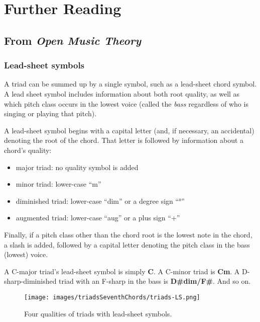 \documentclass{book}
\providecommand{\tightlist}{%
  \setlength{\itemsep}{0pt}\setlength{\parskip}{0pt}}
\begin{document}
\hypertarget{further-reading-26}{%
\section{Further Reading}\label{further-reading-26}}

\hypertarget{from-open-music-theory-25}{%
\subsection{\texorpdfstring{From \emph{Open Music
Theory}}{From Open Music Theory}}\label{from-open-music-theory-25}}

\hypertarget{lead-sheet-symbols}{%
\subsubsection{Lead-sheet symbols}\label{lead-sheet-symbols}}

A triad can be summed up by a single symbol, such as a lead-sheet chord
symbol. A lead sheet symbol includes information about both root quality, as
well as which pitch class occurs in the lowest voice (called the \emph{bass}
regardless of who is singing or playing that pitch).

A lead-sheet symbol begins with a capital letter (and, if necessary, an
accidental) denoting the root of the chord. That letter is followed by
information about a chord's quality:

\begin{itemize}
\tightlist
\item
  major triad: no quality symbol is added
\item
  minor triad: lower-case ``m''
\item
  diminished triad: lower-case ``dim'' or a degree sign ``°''
\item
  augmented triad: lower-case ``aug'' or a plus sign ``+''
\end{itemize}

Finally, if a pitch class other than the chord root is the lowest note in the
chord, a slash is added, followed by a capital letter denoting the pitch class
in the bass (lowest) voice.

A C-major triad's lead-sheet symbol is simply \textbf{C}. A C-minor triad is
\textbf{Cm}. A D-sharp-diminished triad with an F-sharp in the bass is
\textbf{D\#dim/F\#}. And so on.

\begin{figure}
\centering
\texttt{[image: images/triadsSeventhChords/triads-LS.png]}
\caption{Four qualities of triads with lead-sheet symbols.}
\end{figure}
\end{document}
